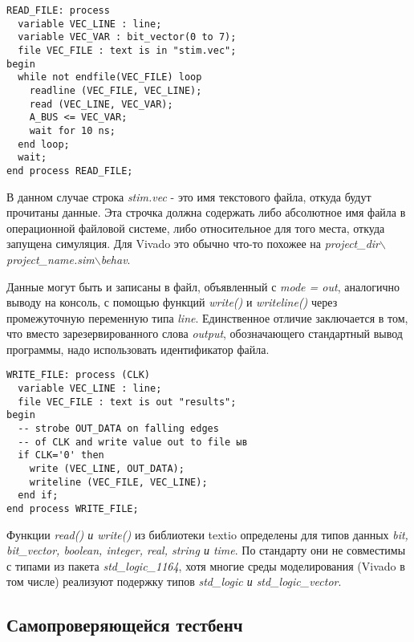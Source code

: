\begin{Code}
\begin{lstlisting}
READ_FILE: process
  variable VEC_LINE : line;
  variable VEC_VAR : bit_vector(0 to 7);
  file VEC_FILE : text is in "stim.vec";
begin
  while not endfile(VEC_FILE) loop
    readline (VEC_FILE, VEC_LINE);
    read (VEC_LINE, VEC_VAR);
    A_BUS <= VEC_VAR;
    wait for 10 ns;
  end loop;
  wait;
end process READ_FILE;
\end{lstlisting}
\end{Code}

В данном случае строка \emph{stim.vec} - это имя текстового файла, откуда будут прочитаны данные. Эта строчка должна содержать либо абсолютное имя файла в операционной файловой системе, либо относительное для того места, откуда запущена симуляция. Для Vivado это обычно что-то похожее на \emph{project\_dir$\backslash$project\_name.sim$\backslash$behav}.

Данные могут быть и записаны в файл, объявленный с \emph{mode = out}, аналогично выводу на консоль, с помощью функций \emph{write()} и \emph{writeline()} через промежуточную переменную типа \emph{line}. Единственное отличие заключается в том, что вместо зарезервированного слова \emph{output}, обозначающего стандартный вывод программы, надо использовать идентификатор файла.

\begin{Code}
\begin{lstlisting}
WRITE_FILE: process (CLK)
  variable VEC_LINE : line;
  file VEC_FILE : text is out "results";
begin
  -- strobe OUT_DATA on falling edges
  -- of CLK and write value out to file ыв
  if CLK='0' then
    write (VEC_LINE, OUT_DATA);
    writeline (VEC_FILE, VEC_LINE);
  end if;
end process WRITE_FILE;
\end{lstlisting}
\end{Code}

Функции \emph{read() и write()} из библиотеки textio определены для типов данных \emph{bit, bit\_vector, boolean, integer, real, string и time}. По стандарту они не совместимы с типами из пакета \emph{std\_logic\_1164}, хотя многие среды моделирования (Vivado в том числе) реализуют подержку типов \emph{std\_logic и std\_logic\_vector}.


\subsection{Самопроверяющейся тестбенч}

